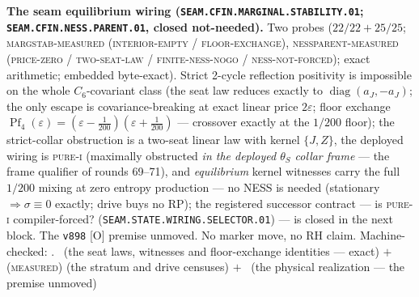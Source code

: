 \par\smallskip\noindent\textbf{The seam equilibrium wiring
(\texttt{SEAM.CFIN.MARGINAL.\allowbreak STABILITY.01};
\texttt{SEAM.CFIN.NESS.\allowbreak PARENT.01}, closed
not-needed).}
Two probes ($22/22 + 25/25$; \textsc{margstab-measured
(interior-empty / floor-exchange)}, \textsc{nessparent-measured
(price-zero / two-seat-law / finite-ness-nogo /
ness-not-forced)}; exact arithmetic; embedded byte-exact).
Strict 2-cycle reflection positivity is impossible on the whole
$C_6$-covariant class (the seat law reduces exactly to
$\operatorname{diag}(a_J, -a_J)$; the only escape is
covariance-breaking at exact linear price $2\varepsilon$; floor
exchange $\operatorname{Pf}_4(\varepsilon) = (\varepsilon -
\tfrac1{200})(\varepsilon + \tfrac1{200})$ --- crossover
exactly at the $1/200$ floor); the strict-collar obstruction is
a two-seat linear law with kernel $\{J, Z\}$, the deployed
wiring is \textsc{pure-i} (maximally obstructed \emph{in the
deployed $\theta_S$ collar frame} --- the frame qualifier of
rounds 69--71), and
\emph{equilibrium} kernel witnesses carry the full $1/200$
mixing at zero entropy production --- no NESS is needed
(stationary $\Rightarrow \sigma \equiv 0$ exactly; drive buys
no RP); the registered successor contract --- is
\textsc{pure-i} compiler-forced?
(\texttt{SEAM.STATE.WIRING.SELECTOR.01}) --- is closed in the
next block.  The \texttt{v898}
[O] premise unmoved.  No marker move, no RH claim.
Machine-checked: .
\mE\ (the seat laws, witnesses and floor-exchange identities
--- exact) $+$ (\textsc{measured}) (the stratum and drive
censuses) $+$ \mO\ (the physical realization --- the premise
unmoved)
\par\smallskip

